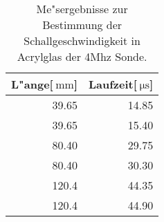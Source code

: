 
\begin{table}[!h]
\begin{center}
\begin{tabular}{|r|r|}
\hline
 L"ange[$\SI{}{\milli\meter}$] & Laufzeit[$\SI{}{\micro\second}$]\\
\hline
\hline
39.65 &	14.85\\
39.65 &	15.40\\
80.40 &	29.75\\
80.40 &	30.30\\
120.4 &	44.35\\
120.4 &	44.90\\
\hline
\end{tabular}
\caption[]{Me"sergebnisse zur Bestimmung der Schallgeschwindigkeit in Acrylglas der 4Mhz Sonde.}
\label{a4}
\end{center}
\end{table}